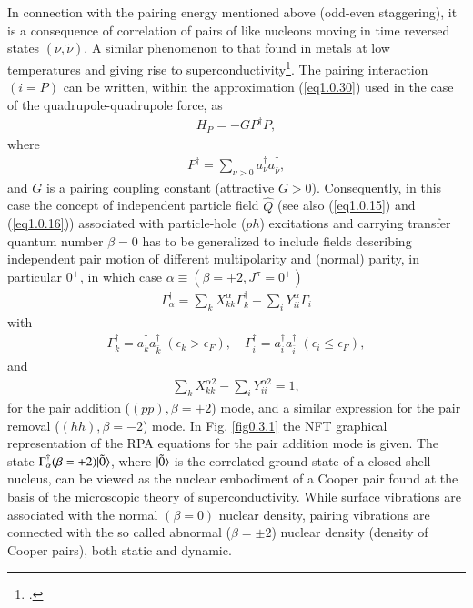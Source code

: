 In connection with the pairing energy mentioned above (odd-even staggering),  it is a consequence of correlation of pairs of like nucleons moving in  time reversed states $(\nu,\tilde \nu)$. A similar phenomenon to that found in metals at low temperatures and giving rise to superconductivity\footnote{\cite{Bohr:58}.}. The pairing interaction $(i=P)$ can be written, within the approximation (\ref{eq1.0.30}) used in the case of the quadrupole-quadrupole force, as 
\begin{align}\label{eq1.0.32}
H_P=- GP^\dagger P,
\end{align}
where 
\begin{align}\label{eq1.0.33}
 P^\dagger=\sum_{\nu>0}a^\dagger_\nu a^\dagger_{\bar\nu},
\end{align}
and $G$ is a pairing coupling constant (attractive $G>0$).
Consequently, in this case the concept of independent particle field $\hat Q$ (see also (\ref{eq1.0.15}) and (\ref{eq1.0.16})) associated with particle-hole ($ph$) excitations and carrying transfer quantum number $\beta=0$ has to be generalized to include fields describing independent pair motion of different multipolarity and (normal) parity, in particular $0^+$, in which case $\alpha\equiv(\beta=+2,J^\pi=0^+)$
\begin{align}\label{eq1.0.34}
\Gamma^\dagger_\alpha=\sum_kX^\alpha_{kk}\Gamma_k^\dagger+\sum_iY^\alpha_{ii}\Gamma_i
\end{align}
with 
\begin{align}\label{eq1.0.35}
\Gamma^\dagger_k=a^\dagger_ka^\dagger_{\bar k}\;(\epsilon_k>\epsilon_F),\quad \Gamma^\dagger_i=a^\dagger_ia^\dagger_{\bar i}\;(\epsilon_i\leq\epsilon_F),
\end{align}
and
\begin{align}\label{eq1.0.36}
\sum_kX_{kk}^{\alpha 2}-\sum_i Y_{ii}^{\alpha 2}=1,
\end{align}
for the pair addition ($(pp),\beta=+2$) mode, and a similar expression for the pair removal ($(hh),\beta=-2$) mode. In Fig. \ref{fig0.3.1} the NFT graphical representation of the RPA equations for the pair addition mode is given. The state $\Gamma^\dagger_\alpha(\beta=+2)|{\tilde 0} \rangle$, where $|{\tilde 0} \rangle$ is the correlated ground state of a closed shell nucleus, can be viewed as the nuclear embodiment of a Cooper pair found at the basis of the microscopic theory of superconductivity.
While surface vibrations are associated with the normal $(\beta=0)$ nuclear density, pairing vibrations are connected with the so called abnormal ($\beta=\pm2$) nuclear density (density of Cooper pairs), both static and dynamic.


